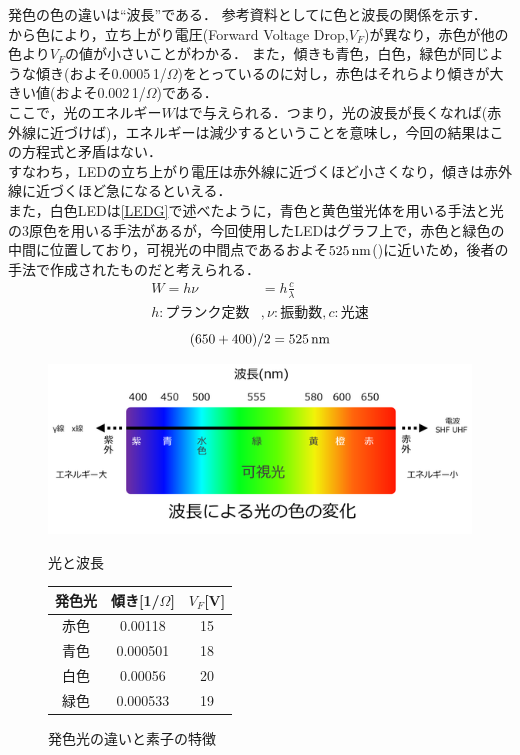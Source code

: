 \begin{enumerate}[実習3-1：]
発色の色の違いは``波長''である．
参考資料としてに色と波長の関係を示す．\\
から色により，立ち上がり電圧(Forward Voltage Drop,$V_{F}$)が異なり，赤色が他の色より$V_{F}$の値が小さいことがわかる．
また，傾きも青色，白色，緑色が同じような傾き(およそ0.0005\,1/\rm{$\Omega$})をとっているのに対し，赤色はそれらより傾きが大きい値(およそ0.002\,1/\rm{$\Omega$})である．\\
ここで，光のエネルギー$W$はで与えられる\cite{1130000795538269056}．つまり，光の波長が長くなれば(赤外線に近づけば)，エネルギーは減少するということを意味し，今回の結果はこの方程式と矛盾はない．\\
すなわち，LEDの立ち上がり電圧は赤外線に近づくほど小さくなり，傾きは赤外線に近づくほど急になるといえる．\\
また，白色LEDは\ref{LEDG}で述べたように，青色と黄色蛍光体を用いる手法と光の3原色を用いる手法があるが，今回使用したLEDはグラフ上で，赤色と緑色の中間に位置しており，可視光の中間点であるおよそ$525\,\rm{nm}$()に近いため，後者の手法で作成されたものだと考えられる．
\begin{align}
W=h\nu&=h\frac{c}{\lambda}\label{eq:W} \\
h:プランク定数&, \nu:振動数, c:光速\nonumber
\end{align}
\begin{equation}
\label{eq:half}
(650+400)/2=525\,\rm{nm}
\end{equation}

\begin{figure}[h]
\begin{minipage}[c]{0.5\hsize}
\centering
\includegraphics[scale=0.5]{./fig/波長による光の色の変化.png}
\caption{光と波長\cite{gbcalasdjdv}}
\label{fig:rl}
  \end{minipage}
  \hfill
  \begin{minipage}[c]{0.5\hsize}
    \centering
\caption{発色光の違いと素子の特徴}
\label{tab:}
\begin{tabular}{ccc}
\hline
発色光&傾き[\rm{1/$\Omega$}]&$V_{F}$[\rm{V}]\\
\hline
赤色 & 0.00118  & 15 \\
青色 & 0.000501 & 18 \\
白色 & 0.00056  & 20 \\
緑色 & 0.000533 & 19 \\
\hline
\end{tabular}
\end{minipage}
\end{figure}
\end{enumerate}

